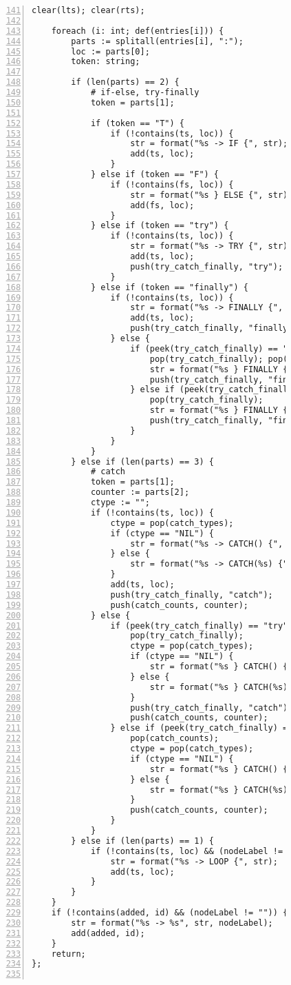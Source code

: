 \begin{figure}[ht!]
\begin{lstlisting}[numbers=left, tabsize=4, escapechar=@, caption={API Usage Mining Analysis},label={lst:aun-code},  firstline = 141, firstnumber = 141, lastline = 201]
	clear(lts); clear(rts);
		
	foreach (i: int; def(entries[i])) {
		parts := splitall(entries[i], ":");
		loc := parts[0];
		token: string;
		
		if (len(parts) == 2) {
			# if-else, try-finally
			token = parts[1];
				
			if (token == "T") {
				if (!contains(ts, loc)) {
					str = format("%s -> IF {", str);
					add(ts, loc);
				}
			} else if (token == "F") {
				if (!contains(fs, loc)) {
					str = format("%s } ELSE {", str);
					add(fs, loc); 
				}
			} else if (token == "try") {
				if (!contains(ts, loc)) {
					str = format("%s -> TRY {", str);
					add(ts, loc);
					push(try_catch_finally, "try");
				}
			} else if (token == "finally") {
				if (!contains(ts, loc)) {
					str = format("%s -> FINALLY {", str);
					add(ts, loc);
					push(try_catch_finally, "finally");
				} else {
					if (peek(try_catch_finally) == "catch") {
						pop(try_catch_finally); pop(catch_counts);
						str = format("%s } FINALLY {", str);
						push(try_catch_finally, "finally");
					} else if (peek(try_catch_finally) == "try") {
					    pop(try_catch_finally);
					    str = format("%s } FINALLY {", str);
					    push(try_catch_finally, "finally");
					}
				}
			} 
		} else if (len(parts) == 3) {
			# catch
			token = parts[1];
			counter := parts[2];
			ctype := "";
			if (!contains(ts, loc)) {
			    ctype = pop(catch_types);
			    if (ctype == "NIL") {
				    str = format("%s -> CATCH() {", str);
			    } else {
			        str = format("%s -> CATCH(%s) {", str, ctype);
			    }
				add(ts, loc);
				push(try_catch_finally, "catch");
				push(catch_counts, counter);
			} else {
				if (peek(try_catch_finally) == "try") {
					pop(try_catch_finally);
					ctype = pop(catch_types);
			        if (ctype == "NIL") {
			            str = format("%s } CATCH() {", str);    
			        } else {
			            str = format("%s } CATCH(%s) {", str, ctype);    
			        }
					push(try_catch_finally, "catch");
					push(catch_counts, counter);
				} else if (peek(try_catch_finally) == "catch" && peek(catch_counts) != counter) {
					pop(catch_counts);
					ctype = pop(catch_types);
			        if (ctype == "NIL") {
			            str = format("%s } CATCH() {", str);    
			        } else {
			            str = format("%s } CATCH(%s) {", str, ctype);    
			        }
					push(catch_counts, counter);
				}
			}
		} else if (len(parts) == 1) {
			if (!contains(ts, loc) && (nodeLabel != "")) {
				str = format("%s -> LOOP {", str);
				add(ts, loc);
			}
		} 
	}
	if (!contains(added, id) && (nodeLabel != "")) {
        str = format("%s -> %s", str, nodeLabel);
        add(added, id);
    }
	return;
};


\end{lstlisting}
\end{figure}
